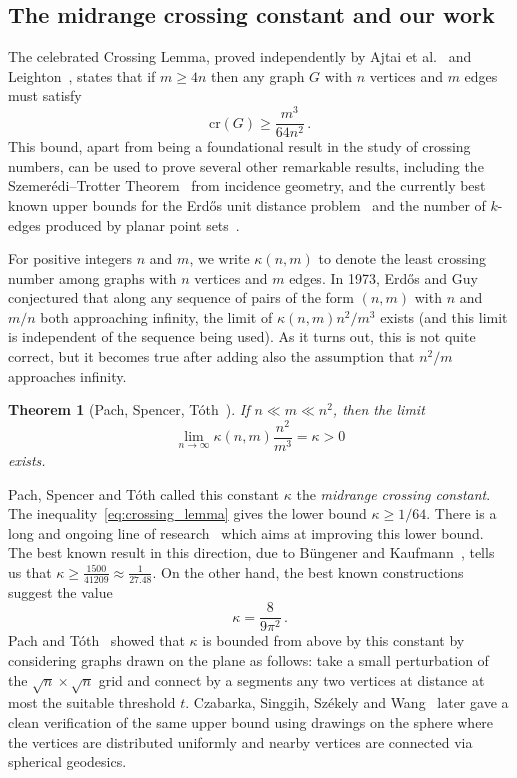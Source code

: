 \documentclass[reqno, 11pt]{amsart}
\newtheorem{theorem}{Theorem}
\theoremstyle{definition}
\begin{document}
\subsection{The midrange crossing constant and our work} The celebrated Crossing Lemma, proved independently by Ajtai et al.~\cite{AjtaiChvatalNewbornSzemeredi1982} and Leighton~\cite{leighton1984new}, states that if $m\geq 4n$ then any graph $G$ with $n$ vertices and $m$ edges must satisfy \begin{equation}\label{eq:crossing_lemma}
\mathrm{cr}(G)\geq \frac{m^3}{64n^2}\,.
\end{equation} This bound, apart from being a foundational result in the study of crossing numbers, can be used to prove several other remarkable results, including the Szemerédi–Trotter Theorem~\cite{szekely1997crossing} from incidence geometry, and the currently best known upper bounds for the Erd\H{o}s unit distance problem~\cite{szekely1997crossing} and the number of $k$-edges produced by planar point sets~\cite{dey1998improved}. 

For positive integers $n$ and $m$, we write $\kappa(n,m)$ to denote the least crossing number among graphs with $n$ vertices and $m$ edges. In 1973, Erd\H{o}s and Guy~\cite{ErdosGuy1973} conjectured that along any sequence of pairs of the form $(n,m)$ with $n$ and $m/n$ both approaching infinity, the limit of $\kappa(n,m){n^2}/{m^3}$ exists (and this limit is independent of the sequence being used). As it turns out, this is not quite correct, but it becomes true after adding also the assumption that $n^2/m$ approaches infinity. 
\begin{theorem}[Pach, Spencer, Tóth~\cite{PachSpencerToth2000}]\label{thm:midrange_exists}
    If $n\ll m\ll n^2$, then the limit \[\lim_{n\rightarrow \infty}\kappa(n,m)\frac{n^2}{m^3}=\kappa>0\] exists.
\end{theorem}
Pach, Spencer and Tóth called this constant $\kappa$ the \textit{midrange crossing constant}. The inequality~\eqref{eq:crossing_lemma} gives the lower bound $\kappa \geq 1/64$. There is a long and ongoing line of research~\cite{PachToth1997,pach2004improving,ackerman2019topological,bungener2024improving} which aims at improving this lower bound. The best known result in this direction, due to B{\"u}ngener and Kaufmann~\cite{bungener2024improving}, tells us that $\kappa\geq\frac{1500}{41209}\approx\frac{1}{27.48}$. On the other hand, the best known constructions suggest the value
\begin{equation}\label{eq:conjectural-midrange-value}
        \kappa=\frac{8}{9\pi^2}\,.
\end{equation}
Pach and T\'oth~\cite{PachToth1997,pach2004improving} showed that $\kappa$ is bounded from above by this constant by considering graphs drawn on the plane as follows: take a small perturbation of the $\sqrt{n} \times \sqrt{n}$ grid and connect by a segments any two vertices at distance at most the suitable threshold $t$.  Czabarka, Singgih, Sz\'ekely and Wang~\cite{CzabarkaSinggihSzekelyWang} later gave a clean verification of the same upper bound using drawings on the sphere where the vertices are distributed uniformly and nearby vertices are connected via spherical geodesics. 
\end{document}

